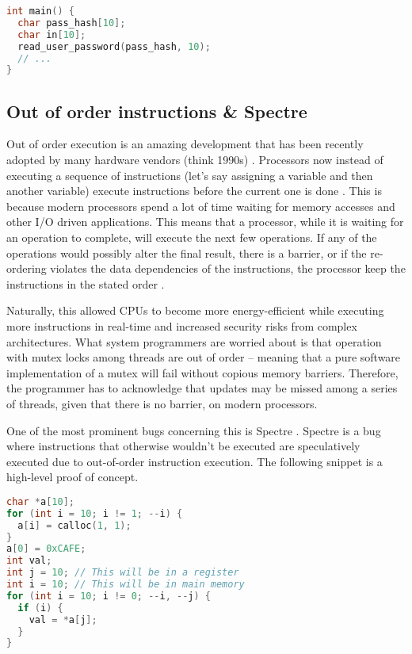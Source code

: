 \begin{lstlisting}[language=C]
int main() {
  char pass_hash[10];
  char in[10];
  read_user_password(pass_hash, 10);
  // ...
}
\end{lstlisting}

\subsection{Out of order instructions \& Spectre}

Out of order execution is an amazing development that has been recently adopted by many hardware vendors (think 1990s) .
Processors now instead of executing a sequence of instructions (let's say assigning a variable and then another variable) execute instructions before the current one is done \cite[P. 45]{guide2011intel}.
This is because modern processors spend a lot of time waiting for memory accesses and other I/O driven applications.
This means that a processor, while it is waiting for an operation to complete, will execute the next few operations.
If any of the operations would possibly alter the final result, there is a barrier, or if the re-ordering violates the data dependencies of the instructions, the processor keep the instructions in the stated order \cite[P. 296]{guide2011intel}.

Naturally, this allowed CPUs to become more energy-efficient while executing more instructions in real-time and increased security risks from complex architectures.
What system programmers are worried about is that operation with mutex locks among threads are out of order -- meaning that a pure software implementation of a mutex will fail without copious memory barriers.
Therefore, the programmer has to acknowledge that updates may be missed among a series of threads, given that there is no barrier, on modern processors.

One of the most prominent bugs concerning this is Spectre \cite{kocher2018spectre}.
Spectre is a bug where instructions that otherwise wouldn't be executed are speculatively executed due to out-of-order instruction execution.
The following snippet is a high-level proof of concept.

\begin{lstlisting}[language=C]
char *a[10];
for (int i = 10; i != 1; --i) {
  a[i] = calloc(1, 1);
}
a[0] = 0xCAFE;
int val;
int j = 10; // This will be in a register
int i = 10; // This will be in main memory
for (int i = 10; i != 0; --i, --j) {
  if (i) {
    val = *a[j];
  }
}
\end{lstlisting}


